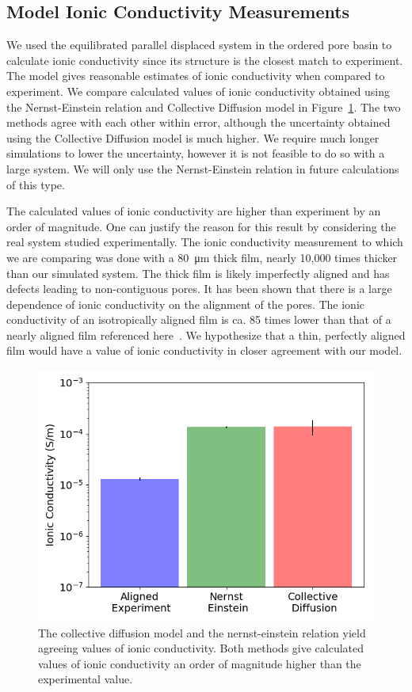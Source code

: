 \documentclass[journal=jpcbfk,manusciprt=article]{achemso}
\begin{document}
  \subsection{Model Ionic Conductivity Measurements}

  We used the equilibrated parallel displaced system in the ordered pore basin
  to calculate ionic conductivity since its structure is the closest match to
  experiment. The model gives reasonable estimates of ionic conductivity when
  compared to experiment.  We compare calculated values of ionic conductivity
  obtained using the Nernst-Einstein relation and Collective Diffusion model in
  Figure~\ref{fig:conductivity}. The two methods agree with each other within
  error, although the uncertainty obtained using the Collective Diffusion model
  is much higher. We require much longer simulations to lower the uncertainty,
  however it is not feasible to do so with a large system. We will only use the
  Nernst-Einstein relation in future calculations of this type. 

  The calculated values of ionic conductivity are higher than experiment by an
  order of magnitude. One can justify the reason for this result by considering
  the real system studied experimentally. The ionic conductivity measurement to
  which we are comparing was done with a \SI{80}{\micro\metre} thick film, nearly
  10,000 times thicker than our simulated system. The thick film is likely
  imperfectly aligned and has defects leading to non-contiguous pores. It has
  been shown that there is a large dependence of ionic conductivity on the
  alignment of the pores. The ionic conductivity of an isotropically aligned film
  is ca. 85 times lower than that of a nearly aligned film referenced
  here~\cite{feng_scalable_2014}. We hypothesize that a thin, perfectly aligned
  film would have a value of ionic conductivity in closer agreement with our
  model.
 
  \begin{figure}
        \centering
        \includegraphics[width=0.5\linewidth]{IC_offset.png}
        \caption{The collective diffusion model and the nernst-einstein relation yield
        agreeing values of ionic conductivity. Both methods give calculated
        values of ionic conductivity an order of magnitude higher than the experimental
        value.}
        \label{fig:conductivity}
  \end{figure}
\end{document}
